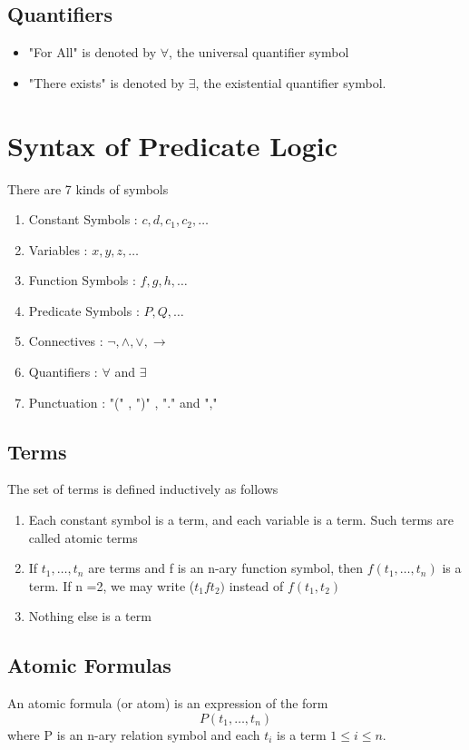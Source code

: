 \documentclass{article}
\begin{document}
\subsection{Quantifiers}
\begin{itemize}
\item "For All" is denoted by \(\forall\), the universal quantifier symbol 
\item "There exists" is denoted by \(\exists\), the existential quantifier symbol. 
\end{itemize}

\section{Syntax of Predicate Logic}
There are 7 kinds of symbols 
\begin{enumerate}
\item Constant Symbols : \(c, d, c_1, c_2, \hdots\)
\item Variables : \(x, y, z, \hdots\)
\item Function Symbols : \(f, g, h, \ldots\)
\item Predicate Symbols : \(P, Q, \ldots\)
\item Connectives : \(\neg, \wedge, \vee, \rightarrow\)
\item Quantifiers : \(\forall\) and \(\exists\)
\item Punctuation :  "(" , ")" , "." and ","
\end{enumerate}

\subsection{Terms}
The set of terms is defined inductively as follows 
\begin{enumerate}
\item Each constant symbol is a term, and each variable is a term. Such terms are called atomic terms
\item If \(t_1, \ldots, t_n\) are terms and f is an n-ary function symbol, then \(f(t_1, \ldots, t_n)\) is a term. If n =2, we may write  (\(t_1 f t_2)\) instead of \(f(t_1, t_2)\)
\item Nothing else is a term
\end{enumerate}

\subsection{Atomic Formulas}
An atomic formula (or atom) is an expression of the form 
$$P(t_1, \ldots, t_n)$$
where P is an n-ary relation symbol and each \(t_i\) is a term \(1 \leq i \leq n\).
\end{document}
